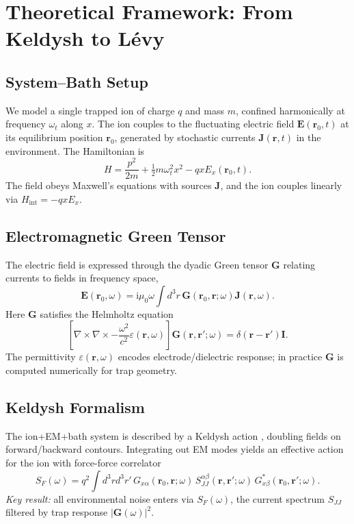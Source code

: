 \section{Theoretical Framework: From Keldysh to L\'evy}

\subsection{System--Bath Setup}
We model a single trapped ion of charge $q$ and mass $m$, confined harmonically at frequency $\omega_t$ along $x$. 
The ion couples to the fluctuating electric field $\mathbf{E}(\mathbf{r}_0,t)$ at its equilibrium position $\mathbf{r}_0$, generated by stochastic currents $\mathbf{J}(\mathbf{r},t)$ in the environment. 
The Hamiltonian is
\begin{equation}
H = \frac{p^2}{2m} + \tfrac{1}{2} m \omega_t^2 x^2 - q x E_x(\mathbf{r}_0,t).
\end{equation}
The field obeys Maxwell's equations with sources $\mathbf{J}$, and the ion couples linearly via $H_{\text{int}} = -q x E_x$.

\subsection{Electromagnetic Green Tensor}
The electric field is expressed through the dyadic Green tensor $\mathbf{G}$ relating currents to fields in frequency space,
\begin{equation}
\mathbf{E}(\mathbf{r}_0,\omega) = \mathrm{i}\mu_0 \omega \int d^3r\, \mathbf{G}(\mathbf{r}_0,\mathbf{r};\omega) \mathbf{J}(\mathbf{r},\omega).
\end{equation}
Here $\mathbf{G}$ satisfies the Helmholtz equation 
\begin{equation}
\left[\nabla\times\nabla\times - \frac{\omega^2}{c^2}\varepsilon(\mathbf{r},\omega)\right]\mathbf{G}(\mathbf{r},\mathbf{r}';\omega) = \delta(\mathbf{r}-\mathbf{r}')\mathbf{I}.
\end{equation}
The permittivity $\varepsilon(\mathbf{r},\omega)$ encodes electrode/dielectric response; in practice $\mathbf{G}$ is computed numerically for trap geometry.

\subsection{Keldysh Formalism}
The ion+EM+bath system is described by a Keldysh action \cite{Kamenev2011}, doubling fields on forward/backward contours. 
Integrating out EM modes yields an effective action for the ion with force-force correlator
\begin{equation}
S_F(\omega) = q^2 \int d^3r d^3r'\, G_{x\alpha}(\mathbf{r}_0,\mathbf{r};\omega)\, S_{JJ}^{\alpha\beta}(\mathbf{r},\mathbf{r}';\omega)\, G^*_{x\beta}(\mathbf{r}_0,\mathbf{r}';\omega).
\label{eq:SF}
\end{equation}
\textit{Key result:} all environmental noise enters via $S_F(\omega)$, the current spectrum $S_{JJ}$ filtered by trap response $|\mathbf{G}(\omega)|^2$.

